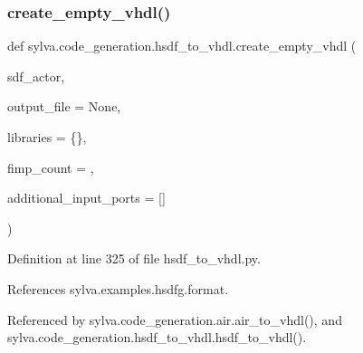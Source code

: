 \subsubsection{\texorpdfstring{create\+\_\+empty\+\_\+vhdl()}{create\_empty\_vhdl()}}
{\footnotesize\ttfamily def sylva.\+code\+\_\+generation.\+hsdf\+\_\+to\+\_\+vhdl.\+create\+\_\+empty\+\_\+vhdl (\begin{DoxyParamCaption}\item[{}]{sdf\+\_\+actor,  }\item[{}]{output\+\_\+file = {\ttfamily None},  }\item[{}]{libraries = {\ttfamily \{\}},  }\item[{}]{fimp\+\_\+count = {},  }\item[{}]{additional\+\_\+input\+\_\+ports = {\ttfamily \mbox{[}\mbox{]}} }\end{DoxyParamCaption})}



Definition at line 325 of file hsdf\+\_\+to\+\_\+vhdl.\+py.



References sylva.\+examples.\+hsdfg.\+format.



Referenced by sylva.\+code\+\_\+generation.\+air.\+air\+\_\+to\+\_\+vhdl(), and sylva.\+code\+\_\+generation.\+hsdf\+\_\+to\+\_\+vhdl.\+hsdf\+\_\+to\+\_\+vhdl().


